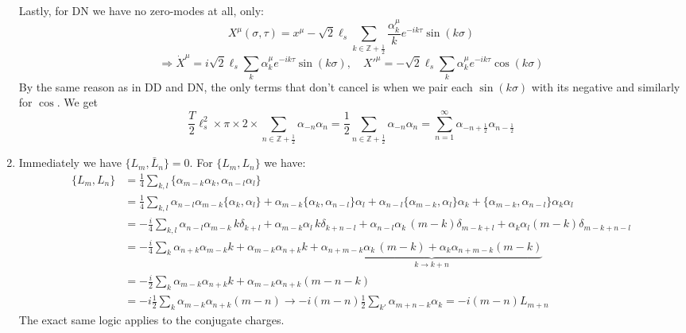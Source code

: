 \documentclass[11pt, class=article, crop=false]{standalone}
\begin{document}
\begin{enumerate}
		Lastly, for DN we have no zero-modes at all, only:
		\begin{equation}
			X^\mu(\sigma, \tau) = x^\mu - \sqrt{2}\ell_s \sum_{k \in \mathbb Z+\frac12} \frac{\alpha^\mu_k}{k} e^{-ik\tau} \sin(k\sigma)
		\end{equation} 
		\[
			\Rightarrow \dot X^\mu = i \sqrt2 \ell_s \sum_k \alpha_k^\mu e^{-ik\tau}\sin(k \sigma), \quad {X'}^\mu = -\sqrt2 \ell_s \sum_k \alpha_k^\mu e^{-ik\tau} \cos(k \sigma)
		\]
		By the same reason as in DD and DN, the only terms that don't cancel is when we pair each $\sin(k \sigma)$ with its negative and similarly for $\cos$. We get
		\begin{equation}
			\frac T2 \ell_s^2 \times \pi \times 2 \times \sum_{n \in \mathbb Z + \frac12} \alpha_{-n} \alpha_n = \frac12 \sum_{n \in \mathbb Z + \frac12} \alpha_{-n} \alpha_n = \sum_{n=1}^\infty \alpha_{-n+\frac12} \alpha_{n-\frac12}
		\end{equation}
		 
		 \item Immediately we have $\{L_m, \bar L_n \} = 0$. For $\{L_m, L_n \}$ we have:
		 \[
		 	\begin{aligned}
		 		\{L_m, L_n \} &= \frac14 \sum_{k, l} \{\alpha_{m-k} \alpha_k , \alpha_{n-l} \alpha_l \} %
				 \\
				& = \frac14 \sum_{k, l}  \alpha_{n-l} \alpha_{m-k} \{\alpha_k ,  \alpha_l \} + \alpha_{m-k} \{\alpha_k , \alpha_{n-l} \}  \alpha_l + \alpha_{n-l}  \{\alpha_{m-k} , \alpha_l \} \alpha_k + \{\alpha_{m-k} , \alpha_{n-l}\}   \alpha_k \alpha_l\\
				& = -\frac i4 \sum_{k, l} \alpha_{n-l} \alpha_{m-k} \, k \delta_{k+l}  + \alpha_{m-k} \alpha_l \, k \delta_{k+n-l} + \alpha_{n-l} \alpha_k \, (m-k) \delta_{m-k+l}  + \alpha_k \alpha_l (m-k) \delta_{m-k+n-l}\\
				& = -\frac i4 \sum_k  \alpha_{n+k} \alpha_{m-k} k  + \alpha_{m-k} \alpha_{n+k} k + \underbrace{ \alpha_{n+m-k} \alpha_k \, (m-k)  + \alpha_k \alpha_{n+m-k} (m-k)}_{k\to k + n } \\
				&  = -\frac{i}{2} \sum_{k} \alpha_{m-k} \alpha_{n+k} k + \alpha_{m-k} \alpha_{n+k} (m-n-k)\\
				& = - i \frac12 \sum_{k} \alpha_{m-k} \alpha_{n+k} (m-n) \to - i (m-n) \frac12 \sum_{k'} \alpha_{m+n-k} \alpha_{k} = - i (m-n) L_{m+n}
		 	\end{aligned}
		 \]
		 The exact same logic applies to the conjugate charges. 
		 
	\end{enumerate}
	
\end{document}
